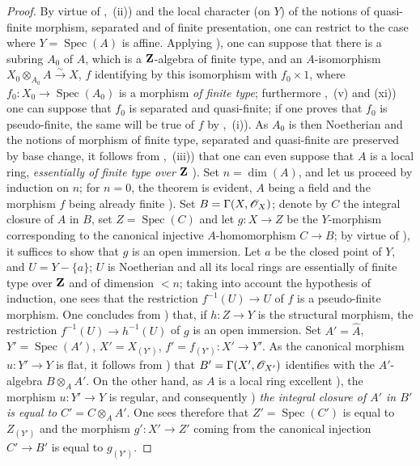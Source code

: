 \begin{proof}
By virtue of ,~(ii)) and the local character (on $Y$) of the notions of quasi-finite morphism, separated and of finite presentation, one can restrict to the case where $Y=\operatorname{Spec}(A)$ is affine.
Applying ), one can suppose that there is a subring $A_0$ of $A$, which is a $\mathbf{Z}$-algebra of finite type, and an $A$-isomorphism $X_0\otimes_{A_0}A\xrightarrow{\sim}X$, $f$ identifying by this isomorphism with $f_0\times 1$, where $f_0:X_0\to\operatorname{Spec}(A_0)$ is a morphism \emph{of finite type}; furthermore ,~(v) and (xi)) one can suppose that $f_0$ is separated and quasi-finite; if one proves that $f_0$ is pseudo-finite, the same will be true of $f$ by ,~(i)).
As $A_0$ is then Noetherian and the notions of morphism of finite type, separated and quasi-finite are preserved by base change, it follows from ,~(iii)) that one can even suppose that $A$ is a local ring, \emph{essentially of finite type over} $\mathbf{Z}$ ).
Set $n=\dim(A)$, and let us proceed by induction on $n$; for $n=0$, the theorem is evident, $A$ being a field and the morphism $f$ being already finite ).
Set $B=\Gamma(X,\mathscr{O}_X)$; denote by $C$ the integral closure of $A$ in $B$, set $Z=\operatorname{Spec}(C)$ and let $g:X\to Z$ be the $Y$-morphism corresponding to the canonical injective $A$-homomorphism $C\to B$; by virtue of ), it suffices to show that $g$ is an open immersion.
Let $a$ be the closed point of $Y$, and $U=Y-\{a\}$; $U$ is Noetherian and all its local rings are essentially of finite type over $\mathbf{Z}$ and of dimension $<n$; taking into account the hypothesis of induction, one sees that the restriction $f^{-1}(U)\to U$ of $f$ is a pseudo-finite morphism.
One concludes from ) that, if $h:Z\to Y$ is the structural morphism, the restriction $f^{-1}(U)\to h^{-1}(U)$ of $g$ is an open immersion.
Set $A'=\hat{A}$, $Y'=\operatorname{Spec}(A')$, $X'=X_{(Y')}$, $f'=f_{(Y')}:X'\to Y'$.
As the canonical morphism $u:Y'\to Y$ is flat, it follows from ) that $B'=\Gamma(X',\mathscr{O}_{X'})$ identifies with the $A'$-algebra $B\otimes_A A'$.
On the other hand, as $A$ is a local ring excellent ), the morphism $u:Y'\to Y$ is regular, and consequently ) \emph{the integral closure of $A'$ in $B'$ is equal to} $C'=C\otimes_A A'$.
One sees therefore that $Z'=\operatorname{Spec}(C')$ is equal to $Z_{(Y')}$ and the morphism $g':X'\to Z'$ coming from the canonical injection $C'\to B'$ is equal to $g_{(Y')}$.

\end{proof}

